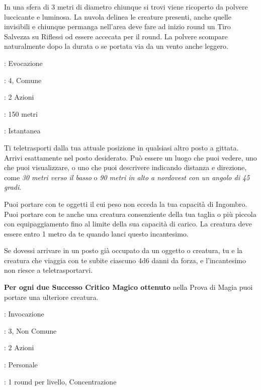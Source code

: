 \begin{multicols}{2}
In una sfera di 3 metri di diametro chiunque si trovi viene ricoperto da polvere luccicante e luminosa. La nuvola delinea le creature presenti, anche quelle invisibili e chiunque permanga nell'area deve fare ad inizio round un Tiro Salvezza su Riflessi od essere accecata per il round. La polvere scompare naturalmente dopo la durata o se portata via da un vento anche leggero.

\noindent\colorbox{OBSSgold!10}{
\begin{minipage}{0.95\linewidth}
\begin{description}[noitemsep, topsep=0pt, parsep=0pt, partopsep=0pt, leftmargin=0cm, labelwidth=1.3cm]
	\item[\textbf{Lista}]: Evocazione
	\item[\textbf{Livello}]: 4, Comune
	\item[\textbf{Lancio}]: 2 Azioni
	\item[\textbf{Gittata}]: 150 metri
	\item[\textbf{Durata}]: Istantanea
\end{description}
\end{minipage}}\smallskip

Ti teletrasporti dalla tua attuale posizione in qualsiasi altro posto a gittata. Arrivi esattamente nel posto desiderato. Può essere un luogo che puoi vedere, uno che puoi visualizzare, o uno che puoi descrivere indicando distanza e direzione, come \emph{30 metri verso il basso} o \emph{90 metri in alto a nordovest con un angolo di 45 gradi}.

Puoi portare con te oggetti il cui peso non ecceda la tua capacità di Ingombro. Puoi portare con te anche una creatura consenziente della tua taglia o più piccola con equipaggiamento fino al limite della sua capacità di carico. La creatura deve essere entro 1 metro da te quando lanci questo incantesimo.

Se dovessi arrivare in un posto già occupato da un oggetto o creatura, tu e la creatura che viaggia con te subite ciascuno 4d6 danni da forza, e l'incantesimo non riesce a teletrasportarvi.

\textbf{Per ogni due Successo Critico Magico ottenuto} nella Prova di Magia puoi portare una ulteriore creatura.

\noindent\colorbox{OBSSgold!10}{
\begin{minipage}{0.95\linewidth}
\begin{description}[noitemsep, topsep=0pt, parsep=0pt, partopsep=0pt, leftmargin=0cm, labelwidth=1.3cm]
	\item[\textbf{Lista}]: Invocazione
	\item[\textbf{Livello}]: 3, Non Comune
	\item[\textbf{Lancio}]: 2 Azioni
	\item[\textbf{Gittata}]: Personale
	\item[\textbf{Durata}]: 1 round per livello, Concentrazione
\end{description}
\end{minipage}}\smallskip


\end{multicols}
